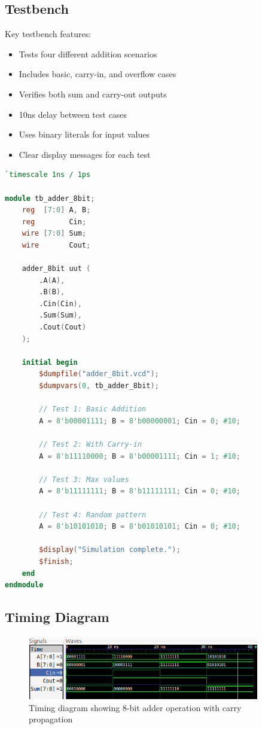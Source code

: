 \documentclass{article}
\begin{document}
\subsection{Testbench}
Key testbench features:
\begin{itemize}
    \item Tests four different addition scenarios
    \item Includes basic, carry-in, and overflow cases
    \item Verifies both sum and carry-out outputs
    \item 10ns delay between test cases
    \item Uses binary literals for input values
    \item Clear display messages for each test
\end{itemize}

\begin{tcolorbox}[title=8-bit Adder Testbench, breakable]
\begin{lstlisting}[language=Verilog]
`timescale 1ns / 1ps

module tb_adder_8bit;
    reg  [7:0] A, B;
    reg        Cin;
    wire [7:0] Sum;
    wire       Cout;

    adder_8bit uut (
        .A(A),
        .B(B),
        .Cin(Cin),
        .Sum(Sum),
        .Cout(Cout)
    );

    initial begin
        $dumpfile("adder_8bit.vcd");
        $dumpvars(0, tb_adder_8bit);

        // Test 1: Basic Addition
        A = 8'b00001111; B = 8'b00000001; Cin = 0; #10;

        // Test 2: With Carry-in
        A = 8'b11110000; B = 8'b00001111; Cin = 1; #10;

        // Test 3: Max values
        A = 8'b11111111; B = 8'b11111111; Cin = 0; #10;

        // Test 4: Random pattern
        A = 8'b10101010; B = 8'b01010101; Cin = 0; #10;

        $display("Simulation complete.");
        $finish;
    end
endmodule
\end{lstlisting}
\end{tcolorbox}

\subsection{Timing Diagram}
\begin{figure}[H]
    \centering
    \includegraphics[width=0.9\textwidth]{3.png}
    \caption{Timing diagram showing 8-bit adder operation with carry propagation}
    \label{fig:adder_timing}
\end{figure}
\end{document}

